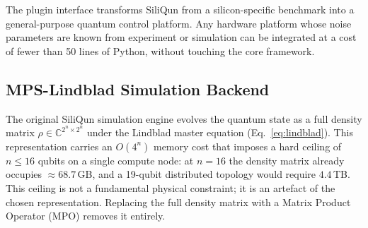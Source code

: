 \begin{table}[tp]
  \centering
  \caption{Minimum plugin contract cost (LOC = lines of code).
    The GAA column reflects the minimum contract: \texttt{gaa\_profile.py}
    + \texttt{gaa\_calibration.json} + \texttt{gaa\_benchmarks.py} = 47~lines.
    The physics-faithful reference implementation totals $\approx$980~lines
    and ships separately. Superconducting and trapped-ion columns are
    projections based on noise model complexity.}
  \label{tab:plugin_cost}
\end{table}

The plugin interface transforms SiliQun from a silicon-specific benchmark into a general-purpose quantum control platform. Any hardware platform whose noise parameters are known from experiment or simulation can be integrated at a cost of fewer than 50 lines of Python, without touching the core framework.

\subsection{MPS-Lindblad Simulation Backend}
\label{subsec:mps_lindblad}

The original SiliQun simulation engine evolves the quantum state as a full density matrix $\rho \in \mathbb{C}^{2^n \times 2^n}$ under the Lindblad master equation (Eq.~\ref{eq:lindblad}).
This representation carries an $O(4^n)$ memory cost that imposes a hard ceiling of $n \leq 16$ qubits on a single compute node: at $n = 16$ the density matrix already occupies $\approx 68.7$\,GB, and a 19-qubit distributed topology would require $4.4$\,TB.
This ceiling is not a fundamental physical constraint; it is an artefact of the chosen representation. Replacing the full density matrix with a Matrix Product Operator (MPO) removes it entirely.

